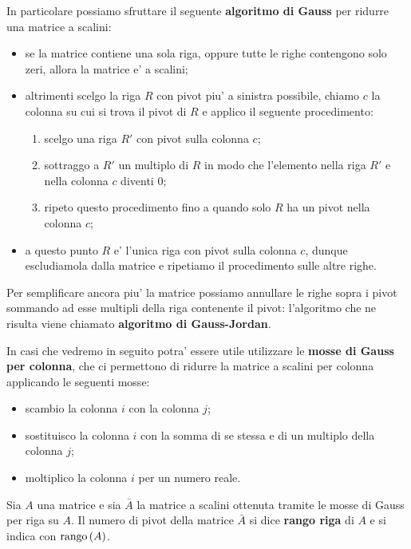 In particolare possiamo sfruttare il seguente \textbf{algoritmo di Gauss} per ridurre una matrice a scalini:
\begin{itemize}
    \item se la matrice contiene una sola riga, oppure tutte le righe contengono solo zeri, allora la matrice e' a scalini;
    \item altrimenti scelgo la riga $R$ con pivot piu' a sinistra possibile, chiamo $c$ la colonna su cui si trova il pivot di $R$ e applico il seguente procedimento: \begin{enumerate}
        \item scelgo una riga $R'$ con pivot sulla colonna $c$;
        \item sottraggo a $R'$ un multiplo di $R$ in modo che l'elemento nella riga $R'$ e nella colonna $c$ diventi $0$;
        \item ripeto questo procedimento fino a quando solo $R$ ha un pivot nella colonna $c$; 
    \end{enumerate}
    \item a questo punto $R$ e' l'unica riga con pivot sulla colonna $c$, dunque escludiamola dalla matrice e ripetiamo il procedimento sulle altre righe.
\end{itemize}

Per semplificare ancora piu' la matrice possiamo annullare le righe sopra i pivot sommando ad esse multipli della riga contenente il pivot: l'algoritmo che ne risulta viene chiamato \textbf{algoritmo di Gauss-Jordan}.

In casi che vedremo in seguito potra' essere utile utilizzare le \textbf{mosse di Gauss per colonna}, che ci permettono di ridurre la matrice a scalini per colonna applicando le seguenti mosse:
\begin{itemize}
    \item scambio la colonna $i$ con la colonna $j$;
    \item sostituisco la colonna $i$ con la somma di se stessa e di un multiplo della colonna $j$;
    \item moltiplico la colonna $i$ per un numero reale. 
\end{itemize}

\begin{definition}
    Sia $A$ una matrice e sia $\bar{A}$ la matrice a scalini ottenuta tramite le mosse di Gauss per riga su $A$. Il numero di pivot della matrice $\bar{A}$ si dice \textbf{rango riga} di $A$ e si indica con $\operatorname{rango}\left( A \right)$.
\end{definition}

